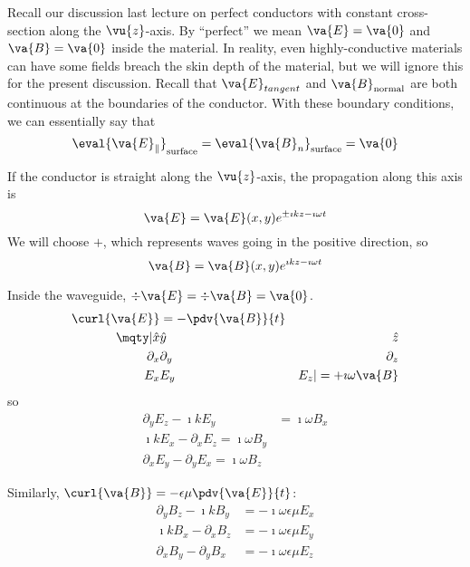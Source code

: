 \documentclass[a4paper,twoside,master.tex]{subfiles}
\begin{document}

Recall our discussion last lecture on perfect conductors with constant cross-section along the $ \vu{z} $-axis. By ``perfect'' we mean $ \va{E} = \va{0} $ and $ \va{B} = \va{0} $ inside the material. In reality, even highly-conductive materials can have some fields breach the skin depth of the material, but we will ignore this for the present discussion. Recall that $ \va{E}_{tangent} $ and $ \va{B}_{\text{normal}} $ are both continuous at the boundaries of the conductor. With these boundary conditions, we can essentially say that
\begin{equation}
    \eval{\va{E}_{\parallel}}_{\text{surface}} = \eval{ \va{B}_n}_{\text{surface}} = \va{0}
\end{equation}

If the conductor is straight along the $ \vu{z} $-axis, the propagation along this axis is
\begin{equation}
    \va{E} = \va{E}(x, y) e^{\pm \imath kz - \imath \omega t}
\end{equation}
We will choose $ + $, which represents waves going in the positive direction, so
\begin{equation}
    \va{B} = \va{B}(x,y) e^{\imath k z - \imath \omega t}
\end{equation}

Inside the waveguide, $ \div{ \va{E}} = \div{ \va{B}} = \va{0} $.
\begin{align}
    \curl{ \va{E}} &= - \pdv{ \va{B}}{t} \\
    \mqty| \hat{x} & \hat{y} & \hat{z} \\ \partial_x & \partial_y & \partial_z \\ E_x & E_y & E_z | = + \imath \omega \va{B}
\end{align}
so
\begin{align}
    \partial_y E_z - \imath k E_y &= \imath \omega B_x \\
    \imath k E_x - \partial_x E_z = \imath \omega B_y \\
    \partial_x E_y - \partial_y E_x = \imath \omega B_z
\end{align}

Similarly, $ \curl{ \va{B}} = - \epsilon \mu \pdv{ \va{E}}{t} $:
\begin{align}
    \partial_y B_z - \imath k B_y &= - \imath \omega \epsilon \mu E_x \\
    \imath k B_x - \partial_x B_z &= - \imath \omega \epsilon \mu E_y \\
    \partial_x B_y - \partial_y B_x &= - \imath \omega \epsilon \mu E_z
\end{align}
\end{document}
